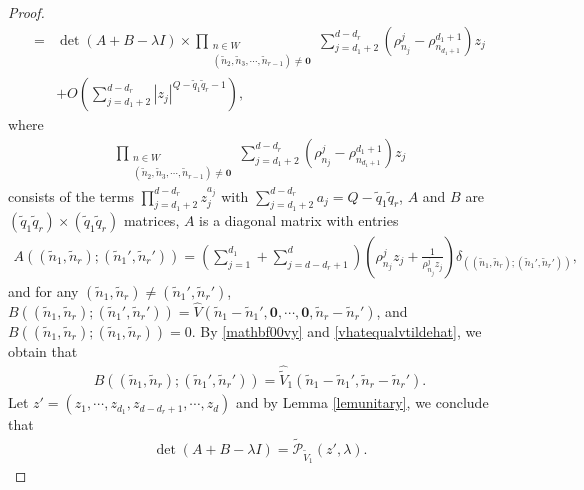 \documentclass[10pt,a4paper]{amsart}
\newcommand{\abs}[1]{\left\lvert #1 \right\rvert}
\begin{document}
\begin{proof}
\begin{align}
=&\det(A+B-\lambda I)\times\prod_{\substack{n\in W\\(\tilde{n}_2,\tilde{n}_3,\cdots,\tilde{n}_{r-1})\neq \mathbf{0}}}\sum_{j={d_1+2}}^{d-d_r}\left(\rho^j_{n_j}-\rho^{d_1+1}_{n_{d_1+1}}\right)z_j\nonumber\\
&+O\left(\sum_{j=d_1+2}^{d-d_r}\abs{z_j}^{Q-\tilde{q}_1\tilde{q}_r-1}\right),\nonumber
\end{align}
where
\begin{align}
\prod_{\substack{n\in W\\(\tilde{n}_2,\tilde{n}_3,\cdots,\tilde{n}_{r-1})\neq \mathbf{0}}}\sum_{j={d_1+2}}^{d-d_r}\left(\rho^j_{n_j}-\rho^{d_1+1}_{n_{d_1+1}}\right)z_j\nonumber
\end{align}
consists of the terms $\prod_{j=d_1+2}^{d-d_r}z_j^{a_j}$ with $\sum_{j=d_1+2}^{d-d_r}a_j=Q-\tilde{q}_1\tilde{q}_r$,
 $A$ and $B$ are $(\tilde{q}_1\tilde{q}_r)\times (\tilde{q}_1\tilde{q}_r)$ matrices, $A$ is a diagonal matrix with entries
\begin{align}
A((\tilde{n}_1,\tilde{n}_r);(\tilde{n}_1',\tilde{n}_r'))=\left(\sum_{j=1}^{d_1}+\sum_{j=d-d_r+1}^{d}\right)\left(\rho^j_{n_j}z_j+\frac{1}{\rho^j_{n_j}z_j}\right)\delta_{((\tilde{n}_1,\tilde{n}_r);(\tilde{n}_1',\tilde{n}_r'))},\nonumber
\end{align}
and for any $(\tilde{n}_1,\tilde{n}_r)\neq (\tilde{n}_1',\tilde{n}_r')$,  $B((\tilde{n}_1,\tilde{n}_r);(\tilde{n}_1',\tilde{n}_r'))=\hat{V}(\tilde{n}_1-\tilde{n}_1',\mathbf{0},\cdots,\mathbf{0},\tilde{n}_r-\tilde{n}_r')$, and $B((\tilde{n}_1,\tilde{n}_r);(\tilde{n}_1,\tilde{n}_r))=0$.
By \eqref{mathbf00vy} and \eqref{vhatequalvtildehat}, we obtain that
\begin{align}
B((\tilde{n}_1,\tilde{n}_r);(\tilde{n}_1',\tilde{n}_r'))=\hat{\tilde{V}}_1(\tilde{n}_1-\tilde{n}_1',\tilde{n}_r-\tilde{n}_r').\nonumber
\end{align}
Let $z'=(z_1,\cdots,z_{d_1},z_{d-d_r+1},\cdots,z_d)$ and by Lemma \ref{lemunitary}, we conclude  that
\begin{align}
\det(A+B-\lambda I)=\tilde{\mathcal{P}}_{\tilde{V}_1}(z',\lambda).\label{detabpv1}
\end{align}


\end{proof}
\end{document}

